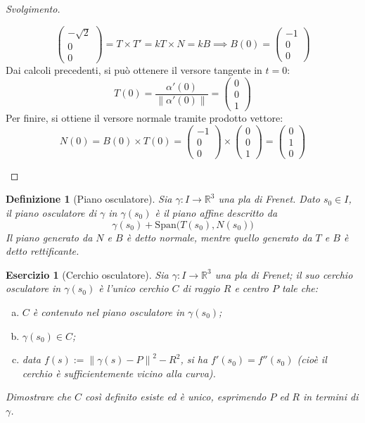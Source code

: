 \documentclass[12pt]{article}
\theoremstyle{style}
\newtheorem{definizione}{Definizione}[section]
\newtheorem{esercizio}{Esercizio}[section]
\newenvironment{svolgimento}{\renewcommand\qedsymbol{$\blacksquare$}\begin{proof}[Svolgimento]}{\end{proof}}
\numberwithin{equation}{subsection}
\begin{document}
\begin{svolgimento}
\begin{enumerate}[(a).]
		\[
		\begin{pmatrix} - \sqrt{2} \\0 \\0 \end{pmatrix} = T \times T' = k T \times N = k B \implies B(0) = \begin{pmatrix} -1 \\0 \\0  \end{pmatrix} 
		\] 
	Dai calcoli precedenti, si pu\`o ottenere il versore tangente in $t=0$:
	\[
	T(0) = \frac{\alpha '(0)}{\left\lVert \alpha '(0) \right\rVert } = \begin{pmatrix} 0 \\ 0 \\ 1 \end{pmatrix} 
	\] 
	Per finire, si ottiene il versore normale tramite prodotto vettore:
	\[
	N(0) = B(0) \times T(0) = \begin{pmatrix} -1 \\0 \\0 \end{pmatrix} \times \begin{pmatrix} 0\\0\\ 1 \end{pmatrix} = \begin{pmatrix} 0 \\ 1 \\0 \end{pmatrix} 
	\] 
	\end{enumerate}
\end{svolgimento}
\begin{definizione}
	[Piano osculatore]
	Sia $\gamma:I\to\mathbb{R}^3$ una pla di Frenet. 
	Dato $s_0 \in I$, il \textit{piano osculatore} di $\gamma$ in $\gamma(s_0)$ \`e il piano affine descritto da
	\[
	\gamma(s_0) + \mathrm{Span} \big(T(s_0),N(s_0)\big)
	\] 
	Il piano generato da $N$ e $B$ \`e detto \textit{normale}, mentre quello generato da $T$ e $B$ \`e detto \textit{rettificante}.
\end{definizione}
\begin{esercizio}
	[Cerchio osculatore]	
	Sia $\gamma : I \to \mathbb{R}^3$ una pla di Frenet; il suo \textit{cerchio osculatore} in $\gamma(s_0)$ \`e l'unico cerchio $C$ di raggio $R$ e centro $P$ tale che:
	\begin{enumerate}[(a).]
		\item $C$ \`e contenuto nel piano osculatore in $\gamma(s_0)$;
		\item $\gamma(s_0) \in C$;
		\item data $f(s) := \left\lVert \gamma(s) - P \right\rVert ^2 - R^2$, si ha $f'(s_0) = f''(s_0)$ (cio\`e il cerchio \`e sufficientemente vicino alla curva).
	\end{enumerate}
	Dimostrare che $C$ cos\`i definito esiste ed \`e unico, esprimendo $P$ ed $R$ in termini di $\gamma$.
\end{esercizio}
\end{document}
